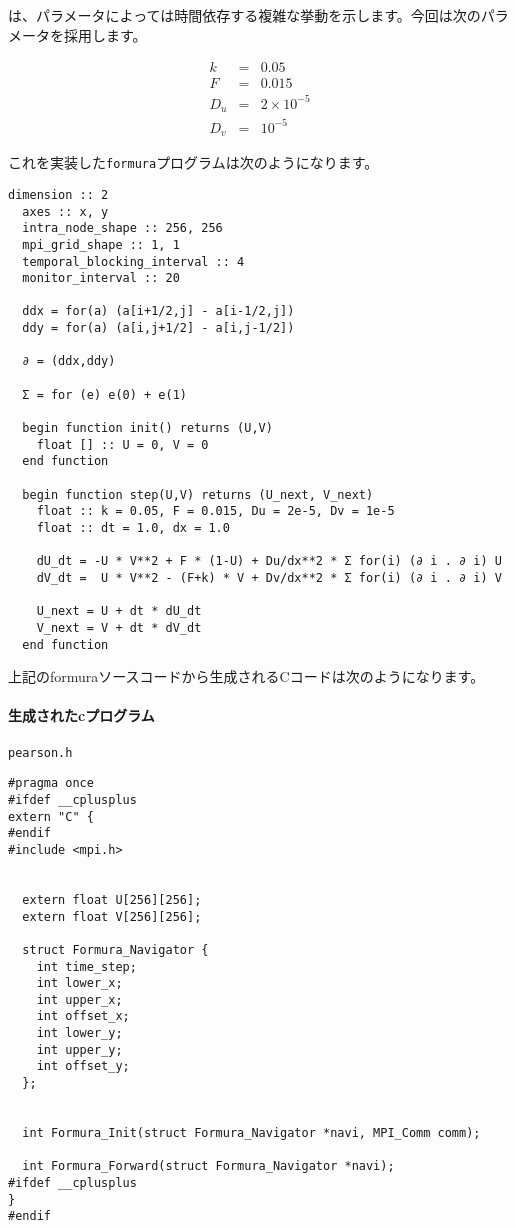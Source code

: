 \documentclass{jsarticle}
\newcommand{\formura}{{\texttt{formura}}}
\begin{document}
は、パラメータによっては時間依存する複雑な挙動を示します。今回は次のパラメータを採用します。

\begin{eqnarray}
  k &=& 0.05\\
  F &=& 0.015\\
  D_u &=& 2 \times 10^{-5}\\
  D_v &=& 10^{-5}
\end{eqnarray}

これを実装した\formura プログラムは次のようになります。

\begin{lstlisting}[mathescape]
  dimension :: 2
  axes :: x, y
  intra_node_shape :: 256, 256
  mpi_grid_shape :: 1, 1
  temporal_blocking_interval :: 4
  monitor_interval :: 20

  ddx = for(a) (a[i+1/2,j] - a[i-1/2,j])
  ddy = for(a) (a[i,j+1/2] - a[i,j-1/2])

  ∂ = (ddx,ddy)

  Σ = for (e) e(0) + e(1)

  begin function init() returns (U,V)
    float [] :: U = 0, V = 0
  end function

  begin function step(U,V) returns (U_next, V_next)
    float :: k = 0.05, F = 0.015, Du = 2e-5, Dv = 1e-5
    float :: dt = 1.0, dx = 1.0

    dU_dt = -U * V**2 + F * (1-U) + Du/dx**2 * Σ for(i) (∂ i . ∂ i) U
    dV_dt =  U * V**2 - (F+k) * V + Dv/dx**2 * Σ for(i) (∂ i . ∂ i) V

    U_next = U + dt * dU_dt
    V_next = V + dt * dV_dt
  end function
\end{lstlisting}


上記のformuraソースコードから生成されるCコードは次のようになります。

\paragraph{生成されたcプログラム}

\verb`pearson.h`
\begin{breakbox}
\begin{verbatim}
#pragma once
#ifdef __cplusplus
extern "C" {
#endif
#include <mpi.h>


  extern float U[256][256];
  extern float V[256][256];

  struct Formura_Navigator {
    int time_step;
    int lower_x;
    int upper_x;
    int offset_x;
    int lower_y;
    int upper_y;
    int offset_y;
  };


  int Formura_Init(struct Formura_Navigator *navi, MPI_Comm comm);

  int Formura_Forward(struct Formura_Navigator *navi);
#ifdef __cplusplus
}
#endif
\end{verbatim}
\end{breakbox}
\end{document}
